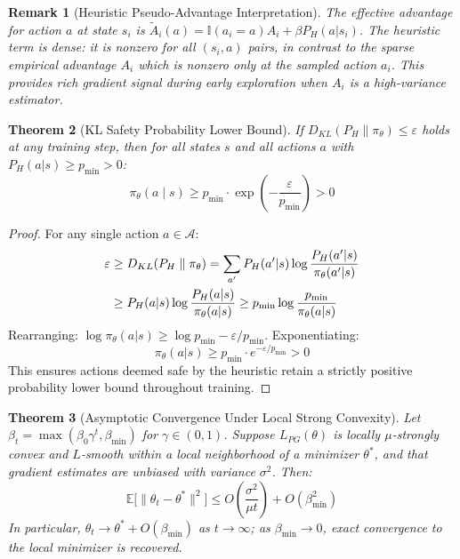 \documentclass{article}
\newtheorem{theorem}{Theorem}[section]
\newtheorem{remark}[theorem]{Remark}
\begin{document}
\begin{remark}[Heuristic Pseudo-Advantage Interpretation]
The effective advantage for action $a$ at state $s_i$ is $\tilde{A}_i(a) = \mathbb{I}(a_i=a)A_i + \beta P_H(a|s_i)$. The heuristic term is \emph{dense}: it is nonzero for all $(s_i, a)$ pairs, in contrast to the sparse empirical advantage $A_i$ which is nonzero only at the sampled action $a_i$. This provides rich gradient signal during early exploration when $A_i$ is a high-variance estimator.
\end{remark}

\begin{theorem}[KL Safety Probability Lower Bound]\label{thm:kl_safety}
If $D_{KL}(P_H \parallel \pi_\theta) \leq \varepsilon$ holds at any training step, then for all states $s$ and all actions $a$ with $P_H(a|s) \geq p_{\min} > 0$:
\begin{equation}
    \pi_\theta(a \mid s) \geq p_{\min} \cdot \exp\!\left(-\frac{\varepsilon}{p_{\min}}\right) > 0
\end{equation}
\end{theorem}

\begin{proof}
For any single action $a \in \mathcal{A}$:
\begin{align}
    \varepsilon &\geq D_{KL}(P_H \parallel \pi_\theta) = \sum_{a'} P_H(a'|s)\log\frac{P_H(a'|s)}{\pi_\theta(a'|s)} \notag \\
    &\geq P_H(a|s)\log\frac{P_H(a|s)}{\pi_\theta(a|s)} \geq p_{\min}\log\frac{p_{\min}}{\pi_\theta(a|s)}
\end{align}
Rearranging: $\log\pi_\theta(a|s) \geq \log p_{\min} - \varepsilon/p_{\min}$. Exponentiating:
\begin{equation}
    \pi_\theta(a|s) \geq p_{\min} \cdot e^{-\varepsilon/p_{\min}} > 0
\end{equation}
This ensures actions deemed safe by the heuristic retain a strictly positive probability lower bound throughout training.
\end{proof}

\begin{theorem}[Asymptotic Convergence Under Local Strong Convexity]\label{thm:beta_convergence}
Let $\beta_t = \max(\beta_0 \gamma^t, \beta_{\min})$ for $\gamma \in (0,1)$. Suppose $L_{PG}(\theta)$ is locally $\mu$-strongly convex and $L$-smooth within a local neighborhood of a minimizer $\theta^*$, and that gradient estimates are unbiased with variance $\sigma^2$. Then:
\begin{equation}
    \mathbb{E}\bigl[\|\theta_t - \theta^*\|^2\bigr] \leq O\!\left(\frac{\sigma^2}{\mu t}\right) + O\!\left(\beta_{\min}^2\right)
\end{equation}
In particular, $\theta_t \to \theta^* + O(\beta_{\min})$ as $t \to \infty$; as $\beta_{\min} \to 0$, exact convergence to the local minimizer is recovered.
\end{theorem}
\end{document}
